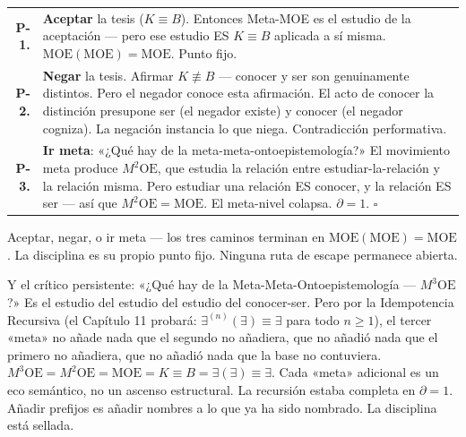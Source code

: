 \documentclass[10pt, openany, oneside]{book}
\renewcommand{\footnotesize}{\fontsize{8.5}{11}\selectfont}
\begin{document}
\vspace{0.5em}

{\footnotesize
\noindent\begin{tabular}{r p{}}
\textbf{P-1.} & \textbf{Aceptar} la tesis ($K \equiv B$). Entonces Meta-MOE es el estudio de la aceptación --- pero ese estudio ES $K \equiv B$ aplicada a sí misma. $\text{MOE}(\text{MOE}) = \text{MOE}$. Punto fijo. \\[0.3em]
\textbf{P-2.} & \textbf{Negar} la tesis. Afirmar $K \not\equiv B$ --- conocer y ser son genuinamente distintos. Pero el negador conoce esta afirmación. El acto de conocer la distinción presupone ser (el negador existe) y conocer (el negador cogniza). La negación instancia lo que niega. Contradicción performativa. \\[0.3em]
\textbf{P-3.} & \textbf{Ir meta}: «¿Qué hay de la meta-meta-ontoepistemología?» El movimiento meta produce $M^2\text{OE}$, que estudia la relación entre estudiar-la-relación y la relación misma. Pero estudiar una relación ES conocer, y la relación ES ser --- así que $M^2\text{OE} = \text{MOE}$. El meta-nivel colapsa. $\partial = 1$. $\square$ \\[0.3em]
\end{tabular}
}

\vspace{0.8em}

\noindent Aceptar, negar, o ir meta --- los tres caminos terminan en $\text{MOE}(\text{MOE}) = \text{MOE}$. La disciplina es su propio punto fijo. Ninguna ruta de escape permanece abierta.

Y el crítico persistente: «¿Qué hay de la Meta-Meta-Ontoepistemología --- $M^3\text{OE}$?» Es el estudio del estudio del estudio del conocer-ser. Pero por la Idempotencia Recursiva (el Capítulo 11 probará: $\exists^{(n)}(\exists) \equiv \exists$ para todo $n \geq 1$), el tercer «meta» no añade nada que el segundo no añadiera, que no añadió nada que el primero no añadiera, que no añadió nada que la base no contuviera. $M^3\text{OE} = M^2\text{OE} = \text{MOE} = K \equiv B = \exists(\exists) \equiv \exists$. Cada «meta» adicional es un eco semántico, no un ascenso estructural. La recursión estaba completa en $\partial = 1$. Añadir prefijos es añadir nombres a lo que ya ha sido nombrado. La disciplina está sellada.

\vspace{1.5em}

\end{document}

